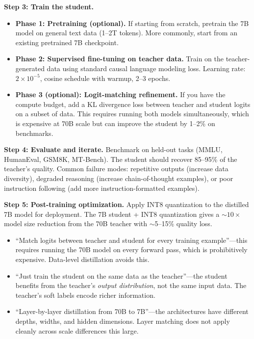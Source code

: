 \begin{interviewq}
\textbf{Step 3: Train the student.}
\begin{itemize}
    \item \textbf{Phase 1: Pretraining (optional).} If starting from scratch, pretrain the 7B model on general text data (1--2T tokens). More commonly, start from an existing pretrained 7B checkpoint.
    \item \textbf{Phase 2: Supervised fine-tuning on teacher data.} Train on the teacher-generated data using standard causal language modeling loss. Learning rate: $2 \times 10^{-5}$, cosine schedule with warmup, 2--3 epochs.
    \item \textbf{Phase 3 (optional): Logit-matching refinement.} If you have the compute budget, add a KL divergence loss between teacher and student logits on a subset of data. This requires running both models simultaneously, which is expensive at 70B scale but can improve the student by 1--2\% on benchmarks.
\end{itemize}

\textbf{Step 4: Evaluate and iterate.}
Benchmark on held-out tasks (MMLU, HumanEval, GSM8K, MT-Bench). The student should recover 85--95\% of the teacher's quality. Common failure modes: repetitive outputs (increase data diversity), degraded reasoning (increase chain-of-thought examples), or poor instruction following (add more instruction-formatted examples).

\textbf{Step 5: Post-training optimization.}
Apply INT8 quantization to the distilled 7B model for deployment. The 7B student + INT8 quantization gives a $\sim$$10\times$ model size reduction from the 70B teacher with $\sim$5--15\% quality loss.

\redflags
\begin{itemize}
    \item ``Match logits between teacher and student for every training example''---this requires running the 70B model on every forward pass, which is prohibitively expensive. Data-level distillation avoids this.
    \item ``Just train the student on the same data as the teacher''---the student benefits from the teacher's \textit{output distribution}, not the same input data. The teacher's soft labels encode richer information.
    \item ``Layer-by-layer distillation from 70B to 7B''---the architectures have different depths, widths, and hidden dimensions. Layer matching does not apply cleanly across scale differences this large.
\end{itemize}


\end{interviewq}

